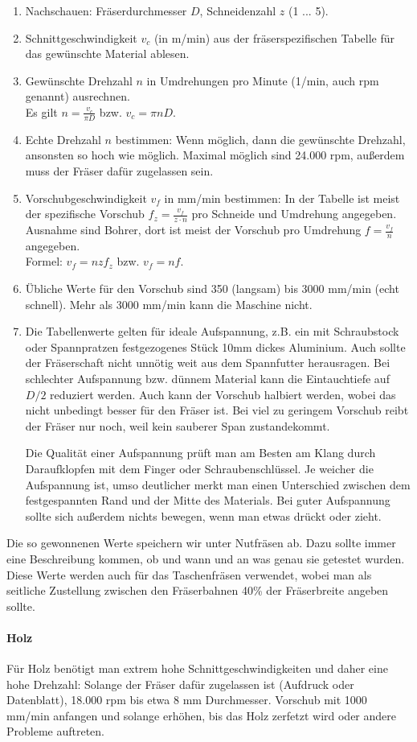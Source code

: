 \documentclass{\basedir/fablab-document}
\begin{document}
\begin{enumerate}
	\item Nachschauen: Fräserdurchmesser $D$, Schneidenzahl $z$ (1 ... 5).
	\item Schnittgeschwindigkeit $v_c$ (in m/min) aus der fräserspezifischen Tabelle für das gewünschte Material ablesen.
	\item Gewünschte Drehzahl $n$ in Umdrehungen pro Minute (1/min, auch rpm genannt) ausrechnen.\\
		Es gilt $n=\frac{v_c}{\pi D}$ bzw. $v_c=\pi n D$.
	\item Echte Drehzahl $n$ bestimmen: Wenn möglich, dann die gewünschte Drehzahl, ansonsten so hoch wie möglich. Maximal möglich sind 24.000 rpm, außerdem muss der Fräser dafür zugelassen sein.
	\item Vorschubgeschwindigkeit $v_f$ in mm/min bestimmen: In der Tabelle ist meist der spezifische Vorschub $f_z=\frac{v_f}{z\cdot n}$ pro Schneide und Umdrehung angegeben. Ausnahme sind Bohrer, dort ist meist der Vorschub pro Umdrehung $f=\frac{v_f}{n}$ angegeben. \\
		Formel: $v_f = n z f_z$ bzw. $v_f=n f$.
	\item Übliche Werte für den Vorschub sind 350 (langsam) bis 3000 mm/min (echt schnell). Mehr als 3000 mm/min kann die Maschine nicht.
	\item Die Tabellenwerte gelten für ideale Aufspannung, z.B. ein mit Schraubstock oder Spannpratzen festgezogenes Stück 10mm dickes Aluminium. Auch sollte der Fräserschaft nicht unnötig weit aus dem Spannfutter herausragen. Bei schlechter Aufspannung bzw. dünnem Material kann die Eintauchtiefe auf $D/2$ reduziert werden. Auch kann der Vorschub halbiert werden, wobei das nicht unbedingt besser für den Fräser ist. Bei viel zu geringem Vorschub reibt der Fräser nur noch, weil kein sauberer Span zustandekommt.

		Die Qualität einer Aufspannung prüft man am Besten am Klang durch Daraufklopfen mit dem Finger oder Schraubenschlüssel. Je weicher die Aufspannung ist, umso deutlicher merkt man einen Unterschied zwischen dem festgespannten Rand und der Mitte des Materials. Bei guter Aufspannung sollte sich außerdem nichts bewegen, wenn man etwas drückt oder zieht.
\end{enumerate}

Die so gewonnenen Werte speichern wir unter Nutfräsen ab. Dazu sollte immer eine Beschreibung kommen, ob und wann und an was genau sie getestet wurden. Diese Werte werden auch für das Taschenfräsen verwendet, wobei man als seitliche Zustellung zwischen den Fräserbahnen 40\% der Fräserbreite angeben sollte.

\paragraph{Holz} Für Holz benötigt man extrem hohe Schnittgeschwindigkeiten und daher eine hohe Drehzahl: Solange der Fräser dafür zugelassen ist (Aufdruck oder Datenblatt), 18.000 rpm bis etwa 8 mm Durchmesser. Vorschub mit 1000 mm/min anfangen und solange erhöhen, bis das Holz zerfetzt wird oder andere Probleme auftreten.


\end{document}
